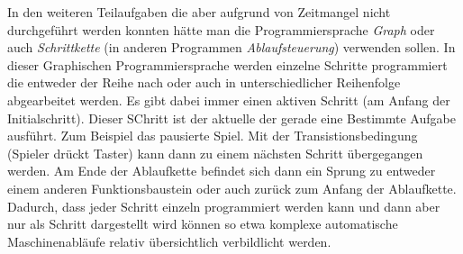 \documentclass[a4paper]{article}
\begin{document}
    In den weiteren Teilaufgaben die aber aufgrund von Zeitmangel nicht durchgeführt werden konnten hätte man die Programmiersprache \textit{Graph} oder auch \textit{Schrittkette} (in anderen Programmen \textit{Ablaufsteuerung}) verwenden sollen. In dieser Graphischen Programmiersprache werden einzelne Schritte programmiert die entweder der Reihe nach oder auch in unterschiedlicher Reihenfolge abgearbeitet werden. Es gibt dabei immer einen aktiven Schritt (am Anfang der Initialschritt). Dieser SChritt ist der aktuelle der gerade eine Bestimmte Aufgabe ausführt. Zum Beispiel das pausierte Spiel. Mit der Transistionsbedingung (Spieler drückt Taster) kann dann zu einem nächsten Schritt übergegangen werden. Am Ende der Ablaufkette befindet sich dann ein Sprung zu entweder einem anderen Funktionsbaustein oder auch zurück zum Anfang der Ablaufkette. Dadurch, dass jeder Schritt einzeln programmiert werden kann und dann aber nur als Schritt dargestellt wird können so etwa komplexe automatische Maschinenabläufe relativ übersichtlich verbildlicht werden. 

    \listoffigures
    \listoftables
\end{document}
